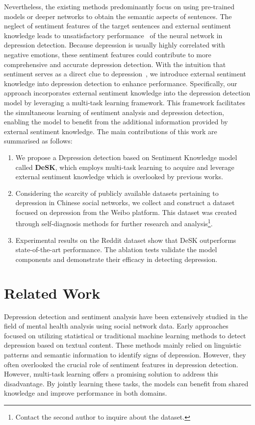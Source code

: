 \documentclass[runningheads]{llncs}
\begin{document}
Nevertheless, the existing methods predominantly focus on using pre-trained models or deeper networks to obtain the semantic aspects of sentences. The neglect of sentiment features of the target sentences and external sentiment knowledge leads to unsatisfactory performance~\cite{chancellor2020methods}\cite{tsugawa2015recognizing} of the neural network in depression detection. Because depression is usually highly correlated with negative emotions, these sentiment features could contribute to more comprehensive and accurate depression detection. With the intuition that sentiment serves as a direct clue to depression~\cite{park2012depressive}, we introduce external sentiment knowledge into depression detection to enhance performance. Specifically, our approach incorporates external sentiment knowledge into the depression detection model by leveraging a multi-task learning framework. This framework facilitates the simultaneous learning of sentiment analysis and depression detection, enabling the model to benefit from the additional information provided by external sentiment knowledge. The main contributions of this work are summarised as follows:

\begin{enumerate}
    \item We propose a Depression detection based on Sentiment Knowledge model called \textbf{DeSK}, which employs multi-task learning to acquire and leverage external sentiment knowledge which is overlooked by previous works.
    
    \item Considering the scarcity of publicly available datasets pertaining to depression in Chinese social networks, we collect and construct a dataset focused on depression from the Weibo platform. This dataset was created through self-diagnosis methods for further research and analysis\footnote{Contact the second author to inquire about the dataset.}. 
    
    \item Experimental results on the Reddit dataset show that DeSK outperforms state-of-the-art performance. The ablation tests validate the model components and demonstrate their efficacy in detecting depression.
\end{enumerate}

\section{Related Work}

Depression detection and sentiment analysis have been extensively studied in the field of mental health analysis using social network data. Early approaches focused on utilizing statistical or traditional machine learning methods to detect depression based on textual content. These methods mainly relied on linguistic patterns and semantic information to identify signs of depression. However, they often overlooked the crucial role of sentiment features in depression detection. However, multi-task learning offers a promising solution to address this disadvantage. By jointly learning these tasks, the models can benefit from shared knowledge and improve performance in both domains.
\end{document}
